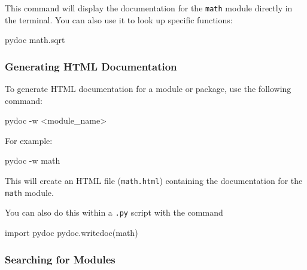 \documentclass[
  letterpaper,
  DIV=11,
  numbers=noendperiod]{scrreprt}
\newenvironment{Shaded}{\begin{snugshade}}{\end{snugshade}}
\newcommand{\AttributeTok}[1]{\textcolor[rgb]{0.40,0.45,0.13}{#1}}
\newcommand{\ExtensionTok}[1]{\textcolor[rgb]{0.00,0.23,0.31}{#1}}
\newcommand{\ImportTok}[1]{\textcolor[rgb]{0.00,0.46,0.62}{#1}}
\newcommand{\NormalTok}[1]{\textcolor[rgb]{0.00,0.23,0.31}{#1}}
\newcommand{\OperatorTok}[1]{\textcolor[rgb]{0.37,0.37,0.37}{#1}}
\newcommand{\StringTok}[1]{\textcolor[rgb]{0.13,0.47,0.30}{#1}}
\begin{document}
This command will display the documentation for the \texttt{math} module
directly in the terminal. You can also use it to look up specific
functions:

\begin{Shaded}
\begin{Highlighting}[]
\ExtensionTok{pydoc}\NormalTok{ math.sqrt}
\end{Highlighting}
\end{Shaded}

\hypertarget{generating-html-documentation}{%
\subsubsection{Generating HTML
Documentation}\label{generating-html-documentation}}

To generate HTML documentation for a module or package, use the
following command:

\begin{Shaded}
\begin{Highlighting}[]
\ExtensionTok{pydoc} \AttributeTok{{-}w} \OperatorTok{\textless{}}\NormalTok{module\_name}\OperatorTok{\textgreater{}}
\end{Highlighting}
\end{Shaded}

For example:

\begin{Shaded}
\begin{Highlighting}[]
\ExtensionTok{pydoc} \AttributeTok{{-}w}\NormalTok{ math}
\end{Highlighting}
\end{Shaded}

This will create an HTML file (\texttt{math.html}) containing the
documentation for the \texttt{math} module.

You can also do this within a \texttt{.py} script with the command

\begin{Shaded}
\begin{Highlighting}[]
\ImportTok{import}\NormalTok{ pydoc}
\NormalTok{pydoc.writedoc(}\StringTok{\textquotesingle{}math\textquotesingle{}}\NormalTok{)}
\end{Highlighting}
\end{Shaded}

\hypertarget{searching-for-modules}{%
\subsubsection{Searching for Modules}\label{searching-for-modules}}
\end{document}
